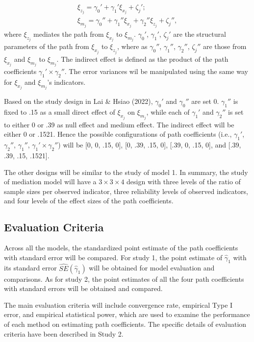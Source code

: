 \documentclass[
  man]{apa7}
\begin{document}
\begin{equation}
\begin{gathered}
\xi_{z_{j}} =  \gamma_{0}' +  \gamma_{1}'\xi_{x_{j}} + \zeta_{j}';\\
\xi_{m_{j}} = \gamma_{0}'' + \gamma_{1}''\xi_{x_{j}} + \gamma_{2}''\xi_{z_{j}} + \zeta_{j}'',
\end{gathered}
\end{equation}
where \(\xi_{z_{j}}\) mediates the path from \(\xi_{x_{j}}\) to \(\xi_{m_{j}}\). \(\gamma_{0}'\), \(\gamma_{1}'\), \(\zeta_{j}'\) are the structural parameters of the path from \(\xi_{x_{j}}\) to \(\xi_{z_{j}}\), where as \(\gamma_{0}''\), \(\gamma_{1}''\), \(\gamma_{2}''\), \(\zeta_{j}''\) are those from \(\xi_{x_{j}}\) and \(\xi_{m_{j}}\) to \(\xi_{m_{j}}\). The indirect effect is defined as the product of the path coefficients \(\gamma_{1}' \times \gamma_{2}''\). The error variances wil be manipulated using the same way for \(\xi_{x_{j}}\) and \(\xi_{m_{j}}\)'s indicators.

Based on the study design in Lai \& Hsiao (2022), \(\gamma_{0}'\) and \(\gamma_{0}''\) are set 0. \(\gamma_{1}''\) is fixed to .15 as a small direct effect of \(\xi_{x_{j}}\) on \(\xi_{m_{j}}\), while each of \(\gamma_{1}'\) and \(\gamma_{2}''\) is set to either 0 or .39 as null effect and medium effect. The indirect effect will be either 0 or .1521. Hence the possible configurations of path coefficients (i.e., \(\gamma_{1}'\), \(\gamma_{2}''\), \(\gamma_{1}''\), \(\gamma_{1}' \times \gamma_{2}''\)) will be {[}0, 0, .15, 0{]}, {[}0, .39, .15, 0{]}, {[}.39, 0, .15, 0{]}, and {[}.39, .39, .15, .1521{]}.

The other designs will be similar to the study of model 1. In summary, the study of mediation model will have a \(3 \times 3 \times 4\) design with three levels of the ratio of sample sizes per observed indicator, three reliability levels of observed indicators, and four levels of the effect sizes of the path coefficients.

\hypertarget{evaluation-criteria}{%
\subsection{Evaluation Criteria}\label{evaluation-criteria}}

Across all the models, the standardized point estimate of the path coefficients with standard error will be compared. For study 1, the point estimate of \(\hat{\gamma}_{1}\) with its standard error \(\hat{SE}(\hat{\gamma}_{1})\) will be obtained for model evaluation and comparisons. As for study 2, the point estimates of all the four path coefficients with standard errors will be obtained and compared.

The main evaluation criteria will include convergence rate, empirical Type I error, and empirical statistical power, which are used to examine the performance of each method on estimating path coefficients. The specific details of evaluation criteria have been described in Study 2.
\end{document}
